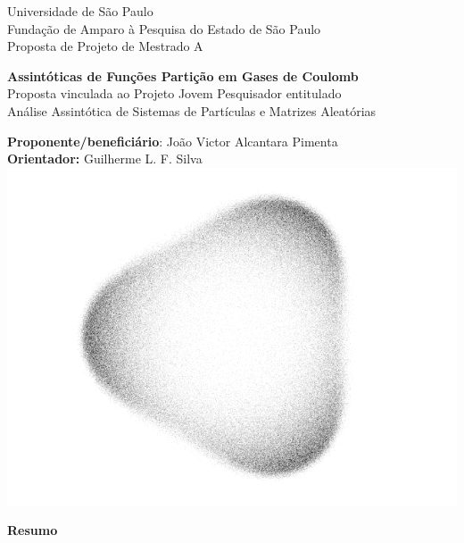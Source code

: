 \documentclass[12pt,a4paper]{article}
\numberwithin{equation}{section} %
\begin{document}
\doublespacing

\begin{titlepage}
    \begin{center}
        {\large \sc Universidade de São Paulo} \\
        {\large \sc Fundação de Amparo à Pesquisa do Estado de São Paulo}\\
        {\large \sc Proposta de Projeto de Mestrado A}
        
        \vspace{1cm}

        {\Large \bfseries Assintóticas de Funções Partição em Gases de Coulomb} \\
        \vspace{1cm}
		{\small \sc Proposta vinculada ao Projeto Jovem Pesquisador entitulado} \\
		{\small \sc Análise Assintótica de Sistemas de Partículas e Matrizes Aleatórias} \\
		\vspace{1cm}

        {\small \sc \textbf{Proponente/beneficiário}: João Victor Alcantara Pimenta}\\
        {\small \sc \textbf{Orientador:} Guilherme L. F. Silva}\\[0.5cm]
        
        \includegraphics[scale=0.30]{Assets/CuteCircleWhite2}
        
    \end{center}

    \vfill

    \begin{center}
        {\bf \large Resumo} \\[1em]
    \end{center}
    

    
\end{titlepage}
\end{document}
